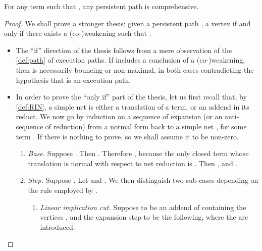 \begin{lemma}
\label{lem:comprehensiveness}
For any term  such that ,
any persistent path  is comprehensive.
\end{lemma}
\begin{proof}
We shall prove a stronger thesis:
given a persistent path ,
a vertex  if and only if
there exists a (co-)weakening  such that .
\begin{itemize}
\item
  The ``if'' direction of the thesis follows from a mere observation of the 
  \autoref{def:path} of execution paths.
  If  includes a conclusion of a (co-)weakening,
  then  is necessarily bouncing or non-maximal,
  in both cases contradicting the hypothesis that  is an execution path.

\item 
  In order to prove the ``only if'' part of the thesis,
  let us first recall that, by \autoref{def:RIN},
  a simple net is either a translation of a term, or an addend in its reduct.
  We now go by induction on a sequence  of expansion (or an 
  anti-sequence of reduction) from a normal form 
  back to a simple net , for some term .
  If  there is nothing to prove,
  so we shall assume it to be non-zero.

  \begin{enumerate}
  \item \textit{Base.}
    Suppose .
    Then .
    Therefore , because the only closed term whose translation is 
    normal with respect to net reduction is .
    Then , and .
  \item \textit{Step.}
    Suppose .
    Let  and .
    We then distinguish two sub-cases depending on the rule employed by .
    \begin{enumerate}
    \item \textit{Linear implication cut.}
      Suppose  to be an addend of  containing the 
      vertices , and the expansion step to be the following, where the 
       are introduced.
      

\end{enumerate}
\end{enumerate}
\end{itemize}
\end{proof}
